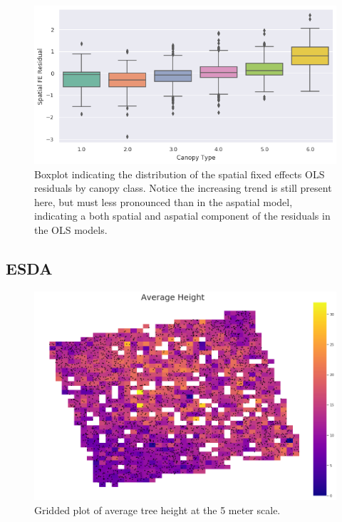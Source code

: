 \documentclass[12pt,a4paper]{article}
\begin{document}
\begin{figure}[H]
\centering
\includegraphics[scale=.7]{../figures/SFE_mod_residuals_by_Canopy.png}
\caption{Boxplot indicating the distribution of the spatial fixed effects OLS residuals by canopy class.  Notice the increasing trend is still present here, but must less pronounced than in the aspatial model, indicating a both spatial and aspatial component of the residuals in the OLS models.}
\label{SFE_mod_residuals_by_Canopy} 
\end{figure}


\subsection{ESDA}

\begin{figure}[H]
\centering
\includegraphics[scale=.45]{../figures/ESDA_height.png}
\caption{Gridded plot of average tree height at the 5 meter scale.}
\label{ESDA_height} 
\end{figure}
\end{document}
